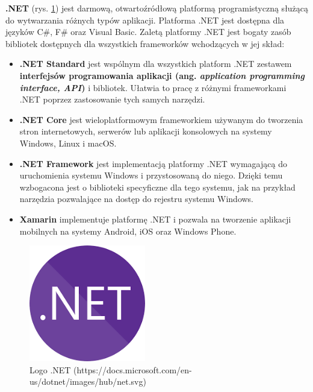 \textbf{.NET} (rys. \ref{dotnet_logo}) jest darmową, otwartoźródłową platformą programistyczną służącą do wytwarzania różnych typów aplikacji. Platforma .NET jest dostępna dla języków C\#, F\# oraz Visual Basic. Zaletą platformy .NET jest bogaty zasób bibliotek dostępnych dla wszystkich frameworków wchodzących w jej skład:
\begin{itemize}
	\item\textbf{.NET Standard} jest wspólnym dla wszystkich platform .NET zestawem \textbf{interfejsów programowania aplikacji (ang. \textit{application programming interface, API})} i bibliotek. Ułatwia to pracę z różnymi frameworkami .NET poprzez zastosowanie tych samych narzędzi.
	\item\textbf{.NET Core} jest wieloplatformowym frameworkiem używanym do tworzenia stron internetowych, serwerów lub aplikacji konsolowych na systemy Windows, Linux i macOS.
	\item\textbf{.NET Framework} jest implementacją platformy .NET wymagającą do uruchomienia systemu Windows i przystosowaną do niego. Dzięki temu wzbogacona jest o biblioteki specyficzne dla tego systemu, jak na przykład narzędzia pozwalające na dostęp do rejestru systemu Windows.
	\item\textbf{Xamarin} implementuje platformę .NET i pozwala na tworzenie aplikacji mobilnych na systemy Android, iOS oraz Windows Phone.\cite{microsoftdotnet}
\end{itemize}
\begin{figure}[!ht]
\begin{center}
	\includegraphics[width=2in]{img/logo/dotnet.png}
	\caption{Logo .NET (https://docs.microsoft.com/en-us/dotnet/images/hub/net.svg)}
	\label{dotnet_logo}
\end{center}
\end{figure}

